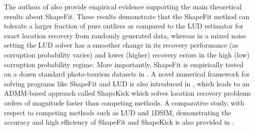 \documentclass[10pt]{article}
\begin{document}
The authors of \cite{ShapeFit} also provide empirical evidence supporting the main theoretical results about ShapeFit. These results demonstrate that the ShapeFit method can tolerate a larger fraction of pure outliers as compared to the LUD estimator for exact location recovery from randomly generated data, whereas in a mixed noise setting the LUD solver has a smoother change in its recovery performance (as corruption probability varies) and lower (higher) recovery errors in the high (low) corruption probability regime. More importantly, ShapeFit is empirically tested on a dozen standard photo-tourism datasets in \cite{ShapeKick}. A novel numerical framework for solving programs like ShapeFit and LUD is also introduced in \cite{ShapeKick}, which leads to an ADMM-based approach called ShapeKick which solves location recovery problems orders of magnitude faster than competing methods. A comparative study, with respect to competing methods such as LUD and 1DSfM, demonstrating the accuracy and high efficiency of ShapeFit and ShapeKick is also provided in \cite{ShapeKick}.
\end{document}
